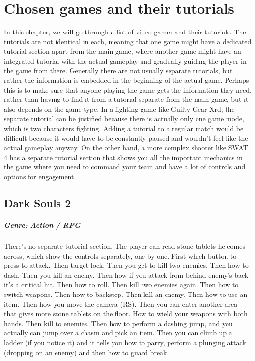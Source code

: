 \chapter{Chosen games and their tutorials}

In this chapter, we will go through a list of video games and their tutorials. The tutorials are not identical in each, meaning that one game might have a dedicated tutorial section apart from the main game, where another game might have an integrated tutorial with the actual gameplay and gradually guiding the player in the game from there. Generally there are not usually separate tutorials, but rather the information is embedded in the beginning of the actual game. Perhaps this is to make sure that anyone playing the game gets the information they need, rather than having to find it from a tutorial separate from the main game, but it also depends on the game type. In a fighting game like Guilty Gear Xrd, the separate tutorial can be justified because there is actually only one game mode, which is two characters fighting. Adding a tutorial to a regular match would be difficult because it would have to be constantly paused and wouldn't feel like the actual gameplay anyway. On the other hand, a more complex shooter like SWAT 4 has a separate tutorial section that shows you all the important mechanics in the game where you need to command your team and have a lot of controls and options for engagement.

\section{Dark Souls 2}
\paragraph{Genre: Action / RPG }

There's no separate tutorial section. The player can read stone tablets he comes across, which show the controls separately, one by one.
First which button to press to attack.
Then target lock.
Then you get to kill two enemies.
Then how to dash.
Then you kill an enemy.
Then how if you attack from behind enemy's back it's a critical hit.
Then how to roll.
Then kill two enemies again.
Then how to switch weapons.
Then how to backstep.
Then kill an enemy.
Then how to use an item.
Then how you move the camera (RS).
Then you can enter another area that gives more stone tablets on the floor.
How to wield your weapons with both hands.
Then kill to enemies.
Then how to perform a dashing jump, and you actually can jump over a chasm and pick an item.
Then you can climb up a ladder (if you notice it) and it tells you how to parry, perform a plunging attack (dropping on an enemy) and then how to guard break.

